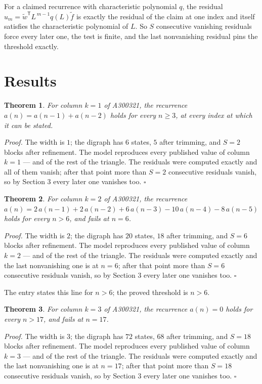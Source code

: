 \documentclass[11pt]{article}
\newtheorem{theorem}{Theorem}
\theoremstyle{definition}
\begin{document}
For a claimed recurrence with characteristic polynomial $q$, the residual $u_m = \tilde w^{\mathsf T}L^{\,m-1}q(L)\tilde f$ is exactly the residual of the claim at one index and itself satisfies the characteristic polynomial of $L$. So $S$ consecutive vanishing residuals force every later one, the test is finite, and the last nonvanishing residual pins the threshold exactly.

\section{Results}

\begin{theorem} For column $k = 1$ of A300321, the recurrence $a(n) = a(n-1) + a(n-2)$ holds for every $n \ge 3$, at every index at which it can be stated.\end{theorem}

{\itshape Proof.} The width is $1$; the digraph has $6$ states, $5$ after trimming, and $S = 2$ blocks after refinement. The model reproduces every published value of column $k = 1$ --- and of the rest of the triangle. The residuals were computed exactly and all of them vanish; after that point more than $S = 2$ consecutive residuals vanish, so by Section 3 every later one vanishes too. $\square$

\begin{theorem} For column $k = 2$ of A300321, the recurrence $a(n) = 2\,a(n-1) + 2\,a(n-2) + 6\,a(n-3) - 10\,a(n-4) - 8\,a(n-5)$ holds for every $n > 6$, and fails at $n = 6$.\end{theorem}

{\itshape Proof.} The width is $2$; the digraph has $20$ states, $18$ after trimming, and $S = 6$ blocks after refinement. The model reproduces every published value of column $k = 2$ --- and of the rest of the triangle. The residuals were computed exactly and the last nonvanishing one is at $n = 6$; after that point more than $S = 6$ consecutive residuals vanish, so by Section 3 every later one vanishes too. $\square$

The entry states this line for $n > 6$; the proved threshold is $n > 6$.

\begin{theorem} For column $k = 3$ of A300321, the recurrence $a(n) = 0$ holds for every $n > 17$, and fails at $n = 17$.\end{theorem}

{\itshape Proof.} The width is $3$; the digraph has $72$ states, $68$ after trimming, and $S = 18$ blocks after refinement. The model reproduces every published value of column $k = 3$ --- and of the rest of the triangle. The residuals were computed exactly and the last nonvanishing one is at $n = 17$; after that point more than $S = 18$ consecutive residuals vanish, so by Section 3 every later one vanishes too. $\square$
\end{document}
